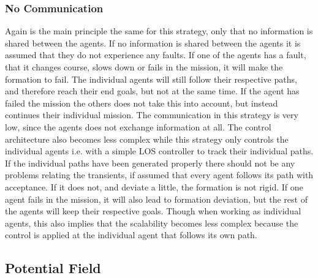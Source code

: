 \subsubsection{No Communication}
Again is the main principle the same for this strategy, only that no information is shared between the agents. If no information is shared between the agents it is assumed that they do not experience any faults. If one of the agents has a fault, that it changes course, slows down or fails in the mission, it will make the formation to fail. The individual agents will still follow their respective paths, and therefore reach their end goals, but not at the same time. If the agent has failed the mission the others does not take this into account, but instead continues their individual mission. The communication in this strategy is very low, since the agents does not exchange information at all. The control architecture also becomes less complex while this strategy only controls the individual agents i.e. with a simple \ac{LOS} controller to track their individual paths. If the individual paths have been generated properly there should not be any problems relating the transients, if assumed that every agent follows its path with acceptance. If it does not, and deviate a little, the formation is not rigid. If one agent fails in the mission, it will also lead to formation deviation, but the rest of the agents will keep their respective goals. Though when working as individual agents, this also implies that the scalability becomes less complex because the control is applied at the individual agent that follows its own path.

\subsection{Potential Field}
